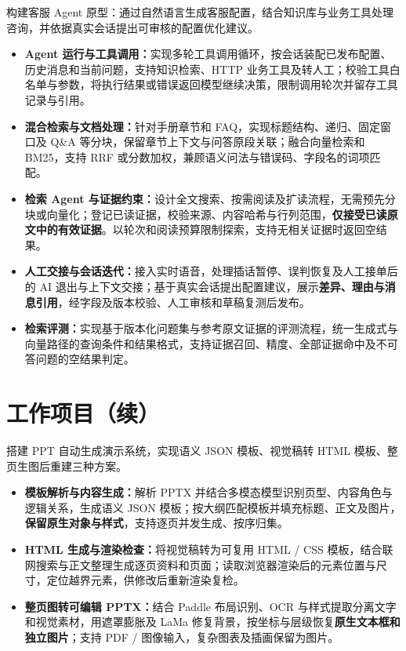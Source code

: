 \documentclass{resume}
\begin{document}
构建客服 Agent 原型：通过自然语言生成客服配置，结合知识库与业务工具处理咨询，并依据真实会话提出可审核的配置优化建议。
\begin{itemize}
  \item \textbf{Agent 运行与工具调用：}实现多轮工具调用循环，按会话装配已发布配置、历史消息和当前问题，支持知识检索、HTTP 业务工具及转人工；校验工具白名单与参数，将执行结果或错误返回模型继续决策，限制调用轮次并留存工具记录与引用。
  \item \textbf{混合检索与文档处理：}针对手册章节和 FAQ，实现标题结构、递归、固定窗口及 Q\&A 等分块，保留章节上下文与问答原段关联；融合向量检索和 BM25，支持 RRF 或分数加权，兼顾语义问法与错误码、字段名的词项匹配。
  \item \textbf{检索 Agent 与证据约束：}设计全文搜索、按需阅读及扩读流程，无需预先分块或向量化；登记已读证据，校验来源、内容哈希与行列范围，\textbf{仅接受已读原文中的有效证据}。以轮次和阅读预算限制探索，支持无相关证据时返回空结果。
  \item \textbf{人工交接与会话迭代：}接入实时语音，处理插话暂停、误判恢复及人工接单后的 AI 退出与上下文交接；基于真实会话提出配置建议，展示\textbf{差异、理由与消息引用}，经字段及版本校验、人工审核和草稿复测后发布。
  \item \textbf{检索评测：}实现基于版本化问题集与参考原文证据的评测流程，统一生成式与向量路径的查询条件和结果格式，支持证据召回、精度、全部证据命中及不可答问题的空结果判定。
\end{itemize}

\newpage
\section{工作项目（续）}
搭建 PPT 自动生成演示系统，实现语义 JSON 模板、视觉稿转 HTML 模板、整页生图后重建三种方案。
\begin{itemize}
  \item \textbf{模板解析与内容生成：}解析 PPTX 并结合多模态模型识别页型、内容角色与逻辑关系，生成语义 JSON 模板；按大纲匹配模板并填充标题、正文及图片，\textbf{保留原生对象与样式}，支持逐页并发生成、按序归集。
  \item \textbf{HTML 生成与渲染检查：}将视觉稿转为可复用 HTML / CSS 模板，结合联网搜索与正文整理生成逐页资料和页面；读取浏览器渲染后的元素位置与尺寸，定位越界元素，供修改后重新渲染复检。
  \item \textbf{整页图转可编辑 PPTX：}结合 Paddle 布局识别、OCR 与样式提取分离文字和视觉素材，用遮罩膨胀及 LaMa 修复背景，按坐标与层级恢复\textbf{原生文本框和独立图片}；支持 PDF / 图像输入，复杂图表及插画保留为图片。
\end{itemize}
\end{document}
